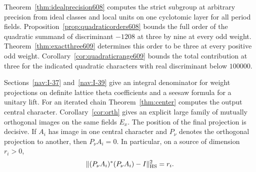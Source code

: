 \documentclass[a4paper,11pt]{article}
\theoremstyle{definition}
\theoremstyle{remark}
\newcommand{\lead}[1]{\par\smallskip\noindent{\bfseries\color{ink}#1.}\enspace}
\numberwithin{equation}{section}
\begin{document}
Theorem~\ref{thm:idealprecision608} computes the strict subgroup at arbitrary precision from ideal classes and local units on one cyclotomic layer for all period fields. Proposition~\ref{prop:quadraticorders608} bounds the full order of the quadratic summand of discriminant \(-1208\) at three by nine at every odd weight. Theorem~\ref{thm:exactthree609} determines this order to be three at every positive odd weight. Corollary~\ref{cor:quadraticrange609} bounds the total contribution at three for the indicated quadratic characters with real discriminant below \(100000\).

\lead{The period estimate}Sections~\ref{nav:I-37} and~\ref{nav:I-39} give an integral denominator for weight projections on definite lattice theta coefficients and a seesaw formula for a unitary lift. For an iterated chain Theorem~\ref{thm:center} computes the output central character. Corollary~\ref{cor:orth} gives an explicit large family of mutually orthogonal images on the same fields \(E_x\). The position of the final projection is decisive. If \(A_i\) has image in one central character and \(P_\nu\) denotes the orthogonal projection to another, then \(P_\nu A_i=0\). In particular, on a source of dimension \(r_i>0\),
\[
          \|(P_\nu A_i)^*(P_\nu A_i)-I\|_{\rm HS}^2=r_i .
\]
\end{document}
